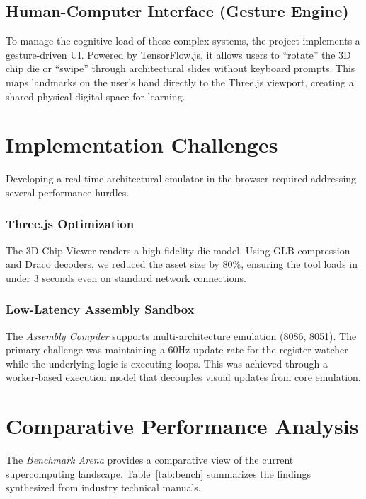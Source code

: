 \documentclass[12pt, a4paper]{article}
\begin{document}
\subsection{Human-Computer Interface (Gesture Engine)}

To manage the cognitive load of these complex systems, the project implements a gesture-driven UI. Powered by TensorFlow.js, it allows users to ``rotate'' the 3D chip die or ``swipe'' through architectural slides without keyboard prompts. This maps landmarks on the user's hand directly to the Three.js viewport, creating a shared physical-digital space for learning.

\section{Implementation Challenges}
\label{sec:implementation}

Developing a real-time architectural emulator in the browser required addressing several performance hurdles.

\subsubsection{Three.js Optimization}
The 3D Chip Viewer renders a high-fidelity die model. Using GLB compression and Draco decoders, we reduced the asset size by 80\%, ensuring the tool loads in under 3 seconds even on standard network connections.

\subsubsection{Low-Latency Assembly Sandbox}
The \textit{Assembly Compiler} supports multi-architecture emulation (8086, 8051). The primary challenge was maintaining a 60Hz update rate for the register watcher while the underlying logic is executing loops. This was achieved through a worker-based execution model that decouples visual updates from core emulation.

\section{Comparative Performance Analysis}
\label{sec:evaluation}

The \textit{Benchmark Arena} provides a comparative view of the current supercomputing landscape. Table~\ref{tab:bench} summarizes the findings synthesized from industry technical manuals.
\end{document}
